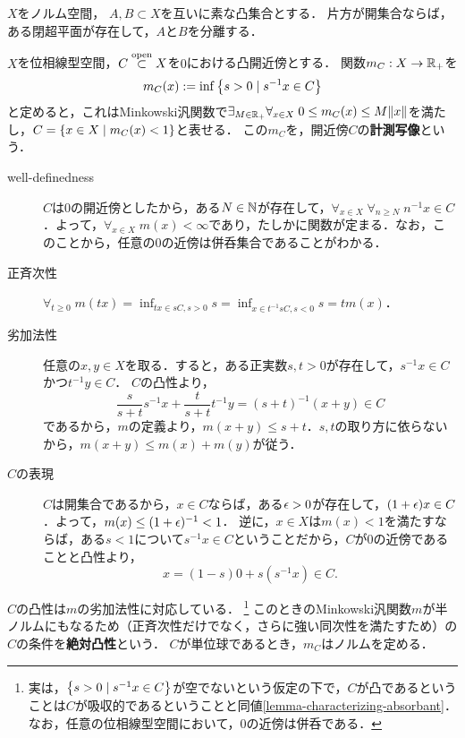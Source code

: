 \documentclass[uplatex,dvipdfmx]{jsreport}
\begin{document}
\begin{theorem}
    $X$をノルム空間，
    $A,B\subset X$を互いに素な凸集合とする．
    片方が開集合ならば，ある閉超平面が存在して，$A$と$B$を分離する．
\end{theorem}

\begin{lemma}[gauge]
    $X$を位相線型空間，$C\overset{\mathrm{open}}{\subset} X$を$0$における凸開近傍とする．
    関数$m_C:X\to\mathbb{R}_+$を
    \[m_C(x):=\inf\left\{s>0\mid s^{-1}x\in C\right\}\]
    と定めると，これはMinkowski汎関数で$\exists_{M\in\mathbb{R}_+}\forall_{x\in X}\;0\le m_C(x)\le M\|x\|$を満たし，$C=\left\{x\in X\mid m_C(x)<1\right\}$と表せる．
    この$m_C$を，開近傍$C$の\textbf{計測写像}という．
\end{lemma}
\begin{Proof}\mbox{}
    \begin{description}
        \item[well-definedness] $C$は$0$の開近傍としたから，ある$N\in\mathbb{N}$が存在して，$\forall_{x\in X}\;\forall_{n\ge N}\;n^{-1}x\in C$．よって，$\forall_{x\in X}\;m(x)<\infty$であり，たしかに関数が定まる．なお，このことから，任意の$0$の近傍は併呑集合であることがわかる．
        \item[正斉次性] $\forall_{t\ge 0}\;m(tx)=\inf_{tx\in sC,s>0}s=\inf_{x\in t^{-1}sC,s<0}s=tm(x)$．
        \item[劣加法性] 任意の$x,y\in X$を取る．すると，ある正実数$s,t>0$が存在して，$s^{-1}x\in C$かつ$t^{-1}y\in C$．
        $C$の凸性より，
        \[\frac{s}{s+t}s^{-1}x+\frac{t}{s+t}t^{-1}y=(s+t)^{-1}(x+y)\in C\]
        であるから，$m$の定義より，$m(x+y)\le s+t$．$s,t$の取り方に依らないから，$m(x+y)\le m(x)+m(y)$が従う．
        \item[$C$の表現] $C$は開集合であるから，$x\in C$ならば，ある$\epsilon>0$が存在して，$(1+\epsilon)x\in C$．よって，$m(x)\le(1+\epsilon)^{-1}<1$．
        逆に，$x\in X$は$m(x)<1$を満たすならば，ある$s<1$について$s^{-1}x\in C$ということだから，$C$が$0$の近傍であることと凸性より，
        \[x=(1-s)0+s(s^{-1}x)\in C.\]
    \end{description}
\end{Proof}
\begin{remarks}[絶対凸性の計測写像による特徴付け]\label{remarks-seminorm-and-absolutely-convex-sets}
    $C$の凸性は$m$の劣加法性に対応している．
    \footnote{実は，$\left\{s>0\mid s^{-1}x\in C\right\}$が空でないという仮定の下で，$C$が凸であるということは$C$が吸収的であるということと同値\ref{lemma-characterizing-absorbant}．なお，任意の位相線型空間において，$0$の近傍は併呑である．}
    このときのMinkowski汎関数$m$が半ノルムにもなるため（正斉次性だけでなく，さらに強い同次性を満たすため）の$C$の条件を\textbf{絶対凸性}という．
    $C$が単位球であるとき，$m_C$はノルムを定める．
\end{remarks}
\end{document}
